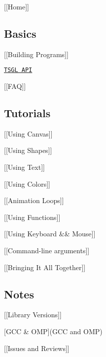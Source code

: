\mbox{[}\mbox{[}Home\mbox{]}\mbox{]}

\subsection*{Basics}


\begin{DoxyItemize}
\item \mbox{[}\mbox{[}Building Programs\mbox{]}\mbox{]}
\item \href{http://calvin-cs.github.io/TSGL/html/annotated.html}{\tt T\+S\+G\+L A\+P\+I}
\item \mbox{[}\mbox{[}F\+A\+Q\mbox{]}\mbox{]}
\end{DoxyItemize}

\subsection*{Tutorials}


\begin{DoxyItemize}
\item \mbox{[}\mbox{[}Using Canvas\mbox{]}\mbox{]}
\item \mbox{[}\mbox{[}Using Shapes\mbox{]}\mbox{]}
\item \mbox{[}\mbox{[}Using Text\mbox{]}\mbox{]}
\item \mbox{[}\mbox{[}Using Colors\mbox{]}\mbox{]}
\item \mbox{[}\mbox{[}Animation Loops\mbox{]}\mbox{]}
\item \mbox{[}\mbox{[}Using Functions\mbox{]}\mbox{]}
\item \mbox{[}\mbox{[}Using Keyboard \&\& Mouse\mbox{]}\mbox{]}
\item \mbox{[}\mbox{[}Command-\/line arguments\mbox{]}\mbox{]}
\item \mbox{[}\mbox{[}Bringing It All Together\mbox{]}\mbox{]}
\end{DoxyItemize}

\subsection*{Notes}


\begin{DoxyItemize}
\item \mbox{[}\mbox{[}Library Versions\mbox{]}\mbox{]}
\item \mbox{[}G\+C\+C \& O\+M\+P\mbox{]}(G\+C\+C and O\+M\+P)
\item \mbox{[}\mbox{[}Issues and Reviews\mbox{]}\mbox{]} 
\end{DoxyItemize}